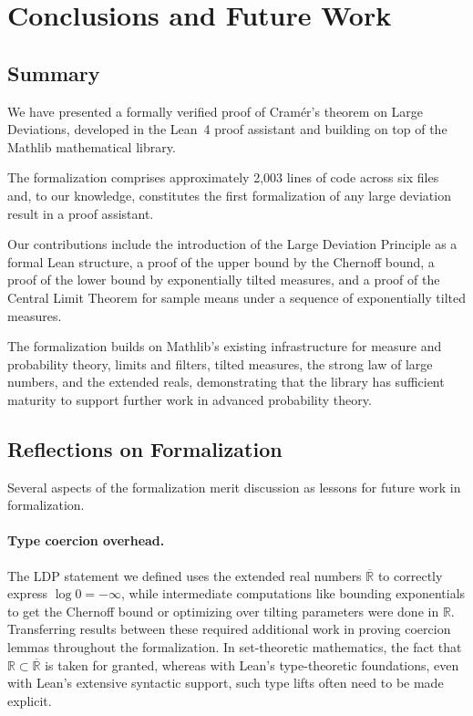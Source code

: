 \documentclass{article}
\newcommand{\R}{\mathbb{R}}
\begin{document}
\section{Conclusions and Future Work}
\label{sec:conclusion}

\subsection{Summary}

We have presented a formally verified proof of Cram{\'e}r's theorem on Large Deviations, developed in the Lean~4 proof assistant and building on top of the Mathlib mathematical library.

The formalization comprises approximately 2,003 lines of code across six files and, to our
knowledge, constitutes the first formalization of any large deviation result in a proof
assistant.

Our contributions include the introduction of the Large Deviation Principle as a formal Lean
structure, a proof of the upper bound by the Chernoff bound, a proof of the lower bound by
exponentially tilted measures, and a proof of the Central Limit Theorem for sample means under
a sequence of exponentially tilted measures.

The formalization builds on Mathlib's existing infrastructure for measure and probability theory, limits and filters, tilted measures, the strong law of large numbers, and the extended reals, demonstrating that the library has sufficient maturity to support further work in
advanced probability theory.

\subsection{Reflections on Formalization}

Several aspects of the formalization merit discussion as lessons for future work in formalization.

\paragraph{Type coercion overhead.}
The LDP statement we defined uses the extended real numbers $\overline{\R}$ to correctly express $\log 0 = -\infty$, while intermediate computations like bounding exponentials to get the Chernoff
bound or optimizing over tilting parameters were done in $\R$.
Transferring results between these required additional work in proving coercion lemmas
throughout the formalization. In set-theoretic mathematics, the fact that
$\R \subset \overline{\R}$ is taken for granted, whereas with Lean's type-theoretic foundations,
even with Lean's extensive syntactic support, such type lifts often need to be made explicit.
\end{document}

